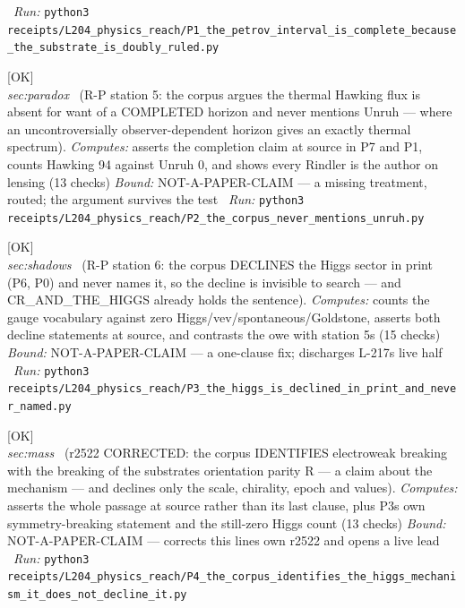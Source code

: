 \begin{description}
\ \emph{Run:} \texttt{python3 receipts/L204\_physics\_reach/P1\_the\_petrov\_interval\_is\_complete\_because\_the\_substrate\_is\_doubly\_ruled.py}
\item[\label{rcpt:P2_the_corpus_never_mentions_unruh}\texttt{P2\_the\_corpus\_never\_mentions\_unruh}]\hfill\textsf{[OK]}\\
\textit{sec:paradox} \ (R-P station 5: the corpus argues the thermal Hawking flux is absent for want of a COMPLETED horizon and never mentions Unruh --- where an uncontroversially observer-dependent horizon gives an exactly thermal spectrum). 
\emph{Computes:} asserts the completion claim at source in P7 and P1, counts Hawking 94 against Unruh 0, and shows every Rindler is the author on lensing (13 checks)
 \emph{Bound:} NOT-A-PAPER-CLAIM --- a missing treatment, routed; the argument survives the test
\ \emph{Run:} \texttt{python3 receipts/L204\_physics\_reach/P2\_the\_corpus\_never\_mentions\_unruh.py}
\item[\label{rcpt:P3_the_higgs_is_declined_in_print_and_never_named}\texttt{P3\_the\_higgs\_is\_declined\_in\_print\_and\_never\_named}]\hfill\textsf{[OK]}\\
\textit{sec:shadows} \ (R-P station 6: the corpus DECLINES the Higgs sector in print (P6, P0) and never names it, so the decline is invisible to search --- and CR\_AND\_THE\_HIGGS already holds the sentence). 
\emph{Computes:} counts the gauge vocabulary against zero Higgs/vev/spontaneous/Goldstone, asserts both decline statements at source, and contrasts the owe with station 5s (15 checks)
 \emph{Bound:} NOT-A-PAPER-CLAIM --- a one-clause fix; discharges L-217s live half
\ \emph{Run:} \texttt{python3 receipts/L204\_physics\_reach/P3\_the\_higgs\_is\_declined\_in\_print\_and\_never\_named.py}
\item[\label{rcpt:P4_the_corpus_identifies_the_higgs_mechanism_it_does_not_decline_it}\texttt{P4\_the\_corpus\_identifies\_the\_higgs\_mechanism\_it\_does\_not\_decline\_it}]\hfill\textsf{[OK]}\\
\textit{sec:mass} \ (r2522 CORRECTED: the corpus IDENTIFIES electroweak breaking with the breaking of the substrates orientation parity R --- a claim about the mechanism --- and declines only the scale, chirality, epoch and values). 
\emph{Computes:} asserts the whole passage at source rather than its last clause, plus P3s own symmetry-breaking statement and the still-zero Higgs count (13 checks)
 \emph{Bound:} NOT-A-PAPER-CLAIM --- corrects this lines own r2522 and opens a live lead
\ \emph{Run:} \texttt{python3 receipts/L204\_physics\_reach/P4\_the\_corpus\_identifies\_the\_higgs\_mechanism\_it\_does\_not\_decline\_it.py}

\end{description}
